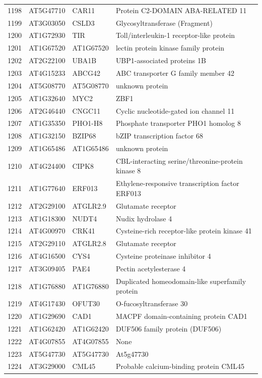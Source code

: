 \documentclass[11pt]{article}
\begin{document}
\begin{center}
\begin{tabular}{rlll}
1198 & AT5G47710 & CAR11 & Protein C2-DOMAIN ABA-RELATED 11\\
1199 & AT3G03050 & CSLD3 & Glycosyltransferase (Fragment)\\
1200 & AT1G72930 & TIR & Toll/interleukin-1 receptor-like protein\\
1201 & AT1G67520 & AT1G67520 & lectin protein kinase family protein\\
1202 & AT2G22100 & UBA1B & UBP1-associated proteins 1B\\
1203 & AT4G15233 & ABCG42 & ABC transporter G family member 42\\
1204 & AT5G08770 & AT5G08770 & unknown protein\\
1205 & AT1G32640 & MYC2 & ZBF1\\
1206 & AT2G46440 & CNGC11 & Cyclic nucleotide-gated ion channel 11\\
1207 & AT1G35350 & PHO1-H8 & Phosphate transporter PHO1 homolog 8\\
1208 & AT1G32150 & BZIP68 & bZIP transcription factor 68\\
1209 & AT1G65486 & AT1G65486 & unknown protein\\
1210 & AT4G24400 & CIPK8 & CBL-interacting serine/threonine-protein kinase 8\\
1211 & AT1G77640 & ERF013 & Ethylene-responsive transcription factor ERF013\\
1212 & AT2G29100 & ATGLR2.9 & Glutamate receptor\\
1213 & AT1G18300 & NUDT4 & Nudix hydrolase 4\\
1214 & AT4G00970 & CRK41 & Cysteine-rich receptor-like protein kinase 41\\
1215 & AT2G29110 & ATGLR2.8 & Glutamate receptor\\
1216 & AT4G16500 & CYS4 & Cysteine proteinase inhibitor 4\\
1217 & AT3G09405 & PAE4 & Pectin acetylesterase 4\\
1218 & AT1G76880 & AT1G76880 & Duplicated homeodomain-like superfamily protein\\
1219 & AT4G17430 & OFUT30 & O-fucosyltransferase 30\\
1220 & AT1G29690 & CAD1 & MACPF domain-containing protein CAD1\\
1221 & AT1G62420 & AT1G62420 & DUF506 family protein (DUF506)\\
1222 & AT4G07855 & AT4G07855 & None\\
1223 & AT5G47730 & AT5G47730 & At5g47730\\
1224 & AT3G29000 & CML45 & Probable calcium-binding protein CML45\\

\end{tabular}
\end{center}
\end{document}
